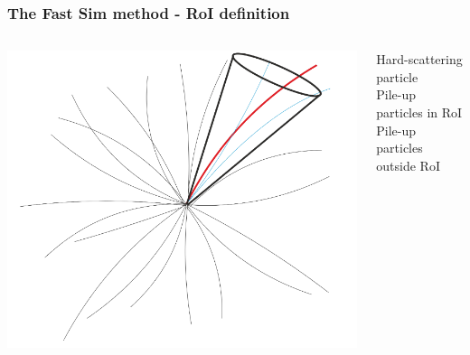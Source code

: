 \documentclass{beamer}
\begin{document}
\begin{frame}
\frametitle{The Fast Sim method - RoI definition}

\begin{columns}[t]
	\begin{column}{.7\textwidth}
		\includegraphics[width=\textwidth,valign=T]{cone}
	\end{column}
	\begin{column}{.3\textwidth}
		
		\small
		{\color{red} Hard-scattering particle} \\
		\vskip0.8cm
		{\color{cyan} Pile-up particles in RoI} \\
		\vskip0.8cm
		{\color{gray} Pile-up particles outside RoI} \\
		\vskip1.5cm
	\end{column}
\end{columns}
	
\end{frame}

\end{document}
